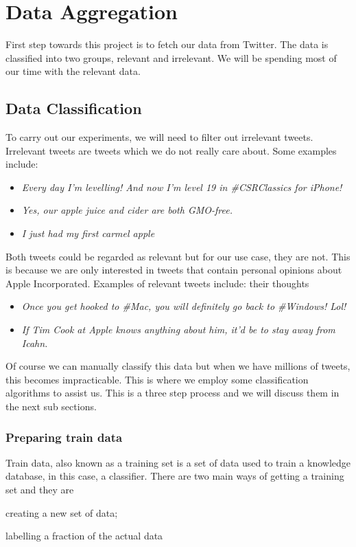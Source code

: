 
\chapter{Data Aggregation}
First step towards this project is to fetch our data from Twitter. The data is classified into two
groups, relevant and irrelevant. We will be spending most of our time with the relevant data.


\section{Data Classification}
To carry out our experiments, we will need to filter out irrelevant tweets. Irrelevant tweets are
tweets which we do not really care about. Some examples include:

\begin{itemize}
  \item \textit{Every day I'm levelling! And now I'm level 19 in \#CSRClassics for iPhone!}
  \item \textit{Yes, our apple juice and cider are both GMO-free.}
  \item \textit{I just had my first carmel apple}
\end{itemize}

Both tweets could be regarded as relevant but for our use case, they are not. This is because we are
only interested in tweets that contain personal opinions about Apple Incorporated. Examples of
relevant tweets include:
their thoughts
\begin{itemize}
  \item \textit{Once you get hooked to \#Mac, you will definitely go back to \#Windows! Lol!}
  \item \textit{If Tim Cook at Apple knows anything about him, it'd be to stay away from Icahn.}
\end{itemize}

Of course we can manually classify this data but when we have millions of tweets, this becomes
impracticable. This is where we employ some classification algorithms to assist us. This is a
three step process and we will discuss them in the next sub sections.

\subsection{Preparing train data}
Train data, also known as a training set is a set of data used to train a knowledge database, in
this case, a classifier. There are two main ways of getting a training set and they are
\begin{enumerate*} [label=\itshape\alph*\upshape)]
  \item creating a new set of data;
  \item labelling a fraction of the actual data
\end{enumerate*}

